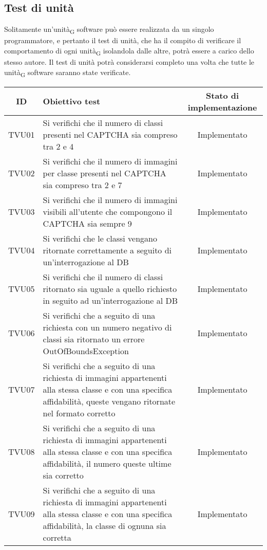 \subsection{Test di unità}
Solitamente un'unità\textsubscript{G} software può essere realizzata da un singolo programmatore, e pertanto il test di unità, che ha il compito di verificare il comportamento di ogni unità\textsubscript{G} isolandola dalle altre, potrà essere a carico dello stesso autore. Il test di unità potrà considerarsi completo una volta che tutte le unità\textsubscript{G} software saranno state verificate.
\begin{center}
	\setlength\extrarowheight{5pt}
	\begin{xltabular}{\textwidth}{|c|X|c|}
		\hline
		\textbf{ID} & \textbf{Obiettivo test} & \textbf{Stato di implementazione} \\
		\hline
		TVU01 & Si verifichi che il numero di classi presenti nel CAPTCHA sia compreso tra 2 e 4 & Implementato\\
		\hline
		TVU02 & Si verifichi che il numero di immagini per classe presenti nel CAPTCHA sia compreso tra 2 e 7 & Implementato\\
		\hline
		TVU03 & Si verifichi che il numero di immagini visibili all'utente che compongono il CAPTCHA sia sempre 9 & Implementato\\
		\hline
		TVU04 & Si verifichi che le classi vengano ritornate correttamente a seguito di un'interrogazione al DB & Implementato\\
		\hline
		TVU05 & Si verifichi che il numero di classi ritornato sia uguale a quello richiesto in seguito ad un'interrogazione al DB & Implementato\\
		\hline
		TVU06 & Si verifichi che a seguito di una richiesta con un numero negativo di classi sia ritornato un errore OutOfBoundsException & Implementato\\
		\hline
		TVU07 & Si verifichi che a seguito di una richiesta di immagini appartenenti alla stessa classe e con una specifica affidabilità, queste vengano ritornate nel formato corretto & Implementato\\
		\hline
		TVU08 &  Si verifichi che a seguito di una richiesta di immagini appartenenti alla stessa classe e con una specifica affidabilità, il numero queste ultime sia corretto & Implementato\\
		\hline
		TVU09 &  Si verifichi che a seguito di una richiesta di immagini appartenenti alla stessa classe e con una specifica affidabilità, la classe di ognuna sia corretta & Implementato\\

\end{xltabular}
\end{center}
